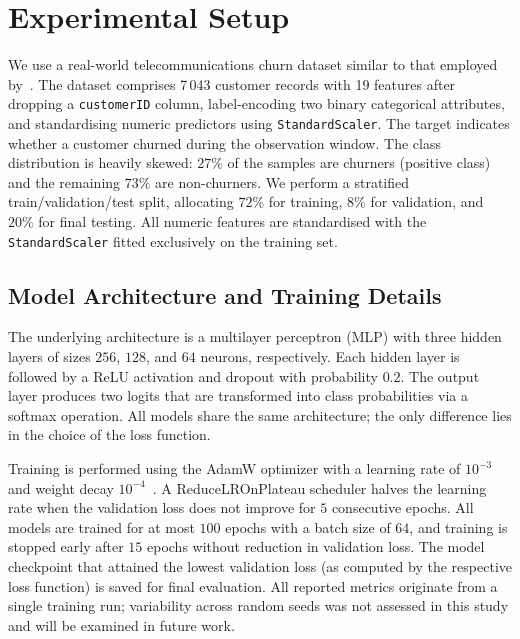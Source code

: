 \documentclass[11pt,a4paper]{article}
\begin{document}
\section{Experimental Setup}
\label{sec:setup}

We use a real-world telecommunications churn dataset similar to that employed by~\citet{fatima2024churn}. The dataset comprises 7\,043 customer records with 19 features after dropping a \texttt{customerID} column, label-encoding two binary categorical attributes, and standardising numeric predictors using \texttt{StandardScaler}. The target indicates whether a customer churned during the observation window. The class distribution is heavily skewed: $27\%$ of the samples are churners (positive class) and the remaining $73\%$ are non-churners. We perform a stratified train/validation/test split, allocating $72\%$ for training, $8\%$ for validation, and $20\%$ for final testing. All numeric features are standardised with the \texttt{StandardScaler} fitted exclusively on the training set.

\subsection{Model Architecture and Training Details}
The underlying architecture is a multilayer perceptron (MLP) with three hidden layers of sizes $256$, $128$, and $64$ neurons, respectively. Each hidden layer is followed by a ReLU activation and dropout with probability $0.2$. The output layer produces two logits that are transformed into class probabilities via a softmax operation. All models share the same architecture; the only difference lies in the choice of the loss function.

Training is performed using the AdamW optimizer with a learning rate of $10^{-3}$ and weight decay $10^{-4}$~\cite{kingma2014adam}. A ReduceLROnPlateau scheduler halves the learning rate when the validation loss does not improve for $5$ consecutive epochs. All models are trained for at most $100$ epochs with a batch size of $64$, and training is stopped early after $15$ epochs without reduction in validation loss. The model checkpoint that attained the lowest validation loss (as computed by the respective loss function) is saved for final evaluation. All reported metrics originate from a single training run; variability across random seeds was not assessed in this study and will be examined in future work.
\end{document}
